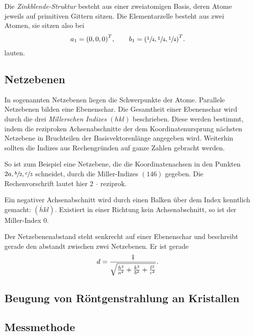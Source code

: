 Die \textit{Zinkblende-Struktur} besteht aus einer zweiatomigen Basis,
deren Atome jeweils auf primitiven Gittern sitzen.
Die Elementarzelle besteht aus zwei Atomen, sie sitzen also bei
\begin{align*}
  a_1 = {\left(0, 0, 0\right)}^T, \hspace{2em} b_1 = {\left(\sfrac{1}{4}, \sfrac{1}{4}, \sfrac{1}{4}\right)}^T.
\end{align*}
lauten.

\subsection{Netzebenen}
In sogenannten Netzebenen liegen die Schwerpunkte der Atome.
Parallele Netzebenen bilden eine Ebenenschar.
Die Gesamtheit einer Ebenenschar wird durch die drei
\textit{Millerschen Indizes} $\left(hkl\right)$ beschrieben.
Diese werden bestimmt, indem die reziproken Achsenabschnitte
der dem Koordinatenursprung nächsten Netzebene in Bruchteilen der
Basisvektorenlänge angegeben wird.
Weiterhin sollten die Indizes aus Rechengründen auf ganze Zahlen gebracht werden.

So ist zum Beispiel eine Netzebene, die die Koordinatenachsen in den
Punkten $2a, \sfrac{b}{2}, \sfrac{c}{3}$ schneidet,
durch die Miller-Indizes $(146)$ gegeben.
Die Rechenvorschrift lautet hier $2~\cdot~\text{reziprok}$.

Ein negativer Achsenabschnitt wird durch einen Balken über dem Index
kenntlich gemacht: $\left(\overline{h}kl\right)$.
Existiert in einer Richtung kein Achsenabschnitt, so ist der Miller-Index 0.

Der Netzebenenabstand steht senkrecht auf einer Ebenenschar und beschreibt
gerade den abstandt zwischen zwei Netzebenen.
Er ist gerade
\begin{equation}
  \label{eq:netzebenensbstand}
  d = \frac{1}{\sqrt{%
    \frac{h^2}{a^2} + \frac{k^2}{b^2} + \frac{l^2}{c^2}
  }}.
\end{equation}

\subsection{Beugung von Röntgenstrahlung an Kristallen}

\subsection{Messmethode}
